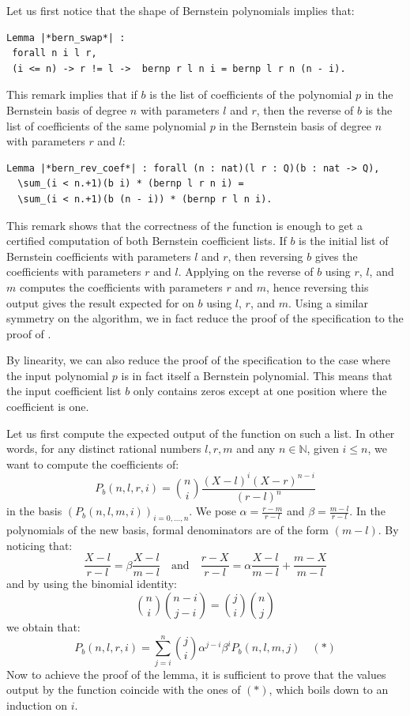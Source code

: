 \documentclass{mscs}
\begin{document}
Let us first notice that the shape of Bernstein polynomials implies
that:
\begin{lstlisting}
Lemma |*bern_swap*| :
 forall n i l r,
 (i <= n) -> r != l ->  bernp r l n i = bernp l r n (n - i).
\end{lstlisting}
This remark implies that if $b$ is the list of coefficients of the
polynomial $p$ in the Bernstein basis of degree $n$ with parameters
$l$ and $r$, then the reverse of $b$ is the list of coefficients of
the same polynomial $p$ in the Bernstein basis of degree $n$ with
parameters $r$ and $l$:

\begin{lstlisting}
Lemma |*bern_rev_coef*| : forall (n : nat)(l r : Q)(b : nat -> Q),
  \sum_(i < n.+1)(b i) * (bernp l r n i) =
  \sum_(i < n.+1)(b (n - i)) * (bernp r l n i).
\end{lstlisting}
This remark shows that the correctness of the  function is
enough to get a certified computation of both Bernstein coefficient
lists.  If $b$ is the
initial list of Bernstein coefficients with parameters $l$ and $r$, then
reversing $b$ gives the  coefficients with parameters $r$ and $l$.
Applying  on the reverse of $b$ using $r$, $l$, and $m$
computes the coefficients with parameters $r$ and $m$, hence reversing
this output gives the result expected for  on $b$ using $l$,
$r$, and $m$. Using a similar symmetry on the
 algorithm, we in fact reduce the proof of the
 specification to the proof of .

By linearity, we can also reduce the proof of the 
specification to the case where the input polynomial $p$ is in fact
itself a Bernstein polynomial. This means that the input coefficient
list $b$ only contains zeros except at one position where the
coefficient is one.

Let us first compute the expected output of the  function on
such a list. In other words, for any distinct rational numbers $l,
r, m$ and any $n\in \mathbb{N}$, given $i \leq n$, we want to compute
the coefficients of:
$$P_b(n, l, r, i) = \binom{n}{i} \frac{(X - l)^i(X - r)^{n -i}}
{(r - l)^n}$$ in the basis $(P_b(n, l, m, i))_{i = 0, \dots, n}$.
We pose
$\alpha = \frac{r -  m}{r - l}$ and $\beta = \frac{m - l}{r - l}$.
In the polynomials of the new basis, formal denominators are of the
form $(m - l)$. By noticing that:
$$\frac{X - l}{r-l} = \beta \frac{X - l}{m - l} \quad \textrm{and} \quad
\frac{r - X}{r - l} = \alpha\frac{X - l}{m - l} +\frac{m - X}{m - l}$$
and by using the binomial identity:
$$\binom{n}{i}\binom{n - i}{j - i}  = \binom{j}{i}\binom{n}{j}$$
we obtain that:
$$P_b(n, l, r, i) =
\sum_{j = i}^n\binom{j}{i}\alpha^{j-i}\beta^i P_b(n, l, m, j)  \quad (*)$$
Now to achieve the proof of the  lemma, it is
sufficient to prove that the values output by the  function
coincide with the ones of $(*)$, which boils down to an induction on $i$.
\end{document}
